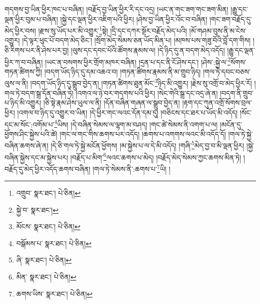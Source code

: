 གདགས་བྱ་ཡིན་ཕྱིར་ཁང་པ་བཞིན། །བརྗོད་བྱ་ཡིན་ཕྱིར་རི་དང་འདྲ། །ཡང་ན་གང་ཟག་གང་ཟག་མིན། །རྒྱུ་དང་ལྡན་ཕྱིར་བུམ་པ་བཞིན། །སྐྱེ་དང་ལྡན་ཕྱིར་འཇིག་པའི་ཕྱིར། །ཤེས་བྱ་ཡིན་ཕྱིར་འོང་བ་བཞིན། །གང་ཟག་བརྗོད་དུ་མེད་ཕྱིར་བས། །རྫས་སུ་ཡོད་པར་མི་འགྱུར་\footnote{འགྲུབ་  སྣར་ཐང་།  པེ་ཅིན། }སྟེ། །དྲི་དང་དཀར་སྔོར་བརྗོད་མེད་པའི། །མོ་གཤམ་བུས་ནི་མ་ངེས་འགྱུར། །དེ་ལྟར་ཕུང་པོ་བདག་མེད་ཅིང་། །སྲོག་མེད་སེམས་ཅན་ཡོད་མིན་པ། །མཁས་པས་གཟུ་བོའི་བློ་དག་གིས། །ཅི་རིགས་པར་ནི་ཤེས་པར་བྱ། །ལུས་དང་དབང་པོའི་ཚོགས་རྣམས་ལ། །དེ་ཉིད་དུ་ན་བདག་མེད་འདོད། །རྒྱུ་དང་ལྡན་ཕྱིར་ཀ་བ་བཞིན། །ཡང་ན་བསགས་ཕྱིར་གྲོག་མཁར་བཞིན། །དྲན་པ་དང་ནི་ངོ་ཤེས་དང་། །ཤེས་:སྐྱེ་ལ་\footnote{སྐྱེ་བ་  སྣར་ཐང་། }སོགས་གཏན་ཚིགས་ཀྱི། །བདག་ཡོད་ཉིད་དུ་དམ་འཆའ་བ། །གཏན་ཚིགས་རྣམས་ནི་མ་གྲུབ་ཉིད། །གལ་ཏེ་དབང་བཅས་ལུས་ལ་ནི། །བདག་ཡོད་ཉིད་དུ་སྒྲུབ་བྱེད་ན། །གཏན་ཚིགས་ཐུན་མོང་\footnote{མོངས་  སྣར་ཐང་།  པེ་ཅིན། }ཉིད་མི་འགྱུར། །རྗེས་སུ་འགྲོ་བ་མེད་ཕྱིར་རོ། །གལ་ཏེ་བདག་སྒྲ་དོན་བཞིན་ཏེ། །འགའ་ལ་ཉེ་བར་གདགས་པའི་ཕྱིར། །སེང་གེའི་སྒྲ་དང་འདྲ་ཞེ་ན། །བདག་ནི་གྲུབ་པ་ཉིད་མི་འགྱུར། །ཅི་སྟེ་རྣམ་ཤེས་ཡུལ་ལ་ནི། །དོན་བཞིན་གཞན་ལ་སྒྲུབ་བྱེད་ན། །རྟག་དང་ཀུན་འགྲོ་སོགས་བྲལ་ཕྱིར། །འགལ་བ་ཉིད་དུ་འགྱུར་བ་ཡིན། །དེ་ཕྱིར་གང་ལའང་དོན་དམ་དུ། །བཅིངས་དང་ཐར་པ་ཡོད་མི་འདོད། །སོང་དང་མ་སོང་:འགོམ་པ་\footnote{བསྒོམས་པ་  སྣར་ཐང་།  པེ་ཅིན། }ཡིས། །དེ་བཞིན་སེམས་ལ་ལྷག་མ་བཤད། །གང་ཚེ་སེམས་ནི་འགག་པ་ལ། །མངོན་དུ་ཕྱོགས་ཤིང་སྐྱེས་པའི་ཚེ། །གང་ལ་གང་གིས་ཆགས་པར་འདོད། །ཆགས་པ་འགགས་ལའང་མི་འདོད་དོ། །གལ་ཏེ་སྐྱེ་བཞིན་ཆགས་ཞེ་ན། །དེ་ཅི་གལ་ཏེ་སྐྱེ་མངོན་ཕྱོགས། །མ་སྐྱེས་པ་ལ་དེ་མི་འདོད། །གཞི་\footnote{ཞི་  སྣར་ཐང་།  པེ་ཅིན། }མེད་བྱ་བ་མི་ལྡན་ཕྱིར། །སྐྱེ་བཞིན་སྐྱེས་དང་མ་སྐྱེས་པར། །བརྗོད་པ་མིག་\footnote{མིན་  སྣར་ཐང་།  པེ་ཅིན། }ལའང་ཆགས་པ་མེད། །བརྗོད་མེད་སེམས་ཀྱང་ཆགས་མིན་ཏེ། །བརྗོད་དུ་མེད་ཕྱིར་འདོད་ཆགས་བཞིན། །གལ་ཏེ་སེམས་ནི་:ཆགས་པ་\footnote{ཆགས་ཡིས་  སྣར་ཐང་།  པེ་ཅིན། }ཡི། །
